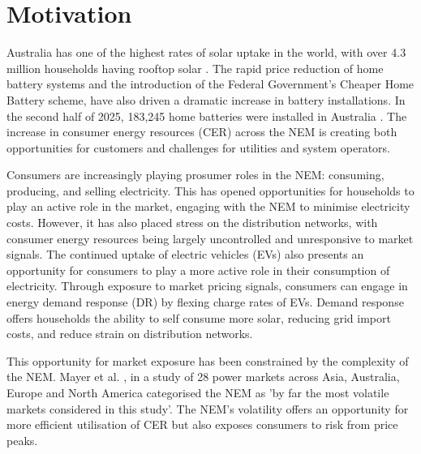 \section{Motivation}
\label{sec:motivation}

Australia has one of the highest rates of solar uptake in the world, with over 4.3 million households having rooftop solar  \cite{rooftop_solar_and_storage_report_CEC}. The rapid price reduction of home battery systems and the introduction of the Federal Government's Cheaper Home Battery scheme, have also driven a dramatic increase in battery installations. In the second half of 2025, 183,245 home batteries were installed in Australia \cite{rooftop_solar_and_storage_report_CEC}. The increase in consumer energy resources (CER) across the NEM is creating both opportunities for customers and challenges for utilities and system operators. 

Consumers are increasingly playing prosumer roles in the NEM: consuming, producing, and selling electricity. This has opened opportunities for households to play an active role in the market, engaging with the NEM to minimise electricity costs. However, it has also placed stress on the distribution networks, with consumer energy resources being largely uncontrolled and unresponsive to market signals. The continued uptake of electric vehicles (EVs) also presents an opportunity for consumers to play a more active role in their consumption of electricity. Through exposure to market pricing signals, consumers can engage in energy demand response (DR) by flexing charge rates of EVs. Demand response offers households the ability to self consume more solar, reducing grid import costs, and reduce strain on distribution networks.

This opportunity for market exposure has been constrained by the complexity of the NEM. Mayer et al. \cite{mayer2018electricity}, in a study of 28 power markets across Asia, Australia, Europe and North America categorised the NEM as 'by far the most volatile markets considered in this study'. The NEM's volatility offers an opportunity for more efficient utilisation of CER but also exposes consumers to risk from price peaks. 
